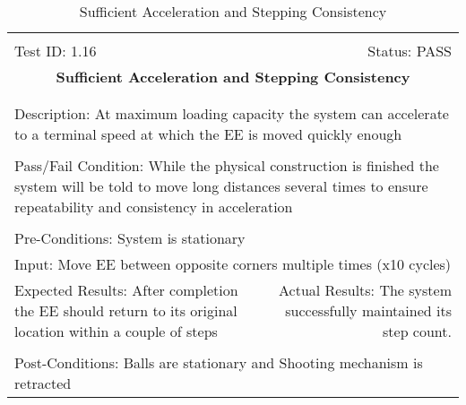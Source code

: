 \documentclass[titlepage]{article}
\begin{document}
\begin{center}
\begin{table}[h!]
\begin{tabular}{|l r|}\hline&\\[-2mm]
	Test ID: 1.16	&Status: PASS\\[-3mm]
	\multicolumn{2}{|c|}{\textbf{\large{Sufficient Acceleration and Stepping Consistency}}}\\&\\\hline&\\[-3mm]
	\multicolumn{2}{|p{\textwidth}|}{Description: At maximum loading capacity the system can accelerate to a terminal speed at which the EE is moved quickly enough}\\[1mm]\hline&\\[-3mm]
	\multicolumn{2}{|p{\textwidth}|}{Pass/Fail Condition: While the physical construction is finished the system will be told to move long distances several times to ensure repeatability and consistency in acceleration}\\[1mm]\hline&\\[-3mm]
	\multicolumn{2}{|p{\textwidth}|}{Pre-Conditions: System is stationary}\\[4mm]
	\multicolumn{2}{|p{\textwidth}|}{Input: Move EE between opposite corners multiple times (x10 cycles)}\\[2mm]\hline
	\multicolumn{1}{|p{0.49\textwidth}}{Expected Results: After completion the EE should return to its original location within a couple of steps}	&\multicolumn{1}{|p{0.45\textwidth}|}{Actual Results: The system successfully maintained its step count.}\\\hline&\\[-3mm]
	\multicolumn{2}{|p{\textwidth}|}{Post-Conditions: Balls are stationary and Shooting mechanism is retracted}\\\hline
\end{tabular}
\caption{Sufficient Acceleration and Stepping Consistency}
\end{table}
\end{center}
\end{document}
